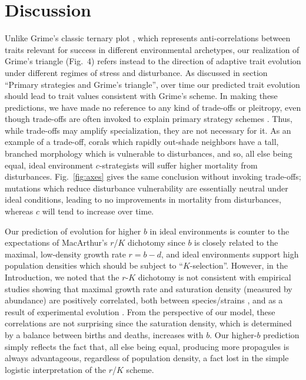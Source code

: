 \documentclass[11pt]{article}
\begin{document}
\section*{Discussion}

Unlike Grime's classic ternary plot \citep{grime_1974}, which represents anti-correlations between traits relevant for success in different environmental archetypes, our realization of Grime's triangle (Fig.~4) refers instead to the direction of adaptive trait evolution under different regimes of stress and disturbance. As discussed in section ``Primary strategies and Grime's triangle'', over time our predicted trait evolution should lead to trait values consistent with Grime's scheme. In making these predictions, we have made no reference to any kind of trade-offs or pleitropy, even though trade-offs are often invoked to explain primary strategy schemes \citep{macarthur_1962,winemiller_1992,aerts_1999}. Thus, while trade-offs may amplify specialization, they are not necessary for it. As an example of a trade-off, corals which rapidly out-shade neighbors have a tall, branched morphology which is vulnerable to disturbances, and so, all else being equal, ideal environment $c$-strategists will suffer higher mortality from disturbances. Fig.~\ref{fig:axes} gives the same conclusion without invoking trade-offs; mutations which reduce disturbance vulnerability are essentially neutral under ideal conditions, leading to no improvements in mortality from disturbances, whereas $c$ will tend to increase over time. 

Our prediction of evolution for higher $b$ in ideal environments is counter to the expectations of MacArthur's $r$/$K$ dichotomy \citep{macarthur_1962} since $b$ is closely related to the maximal, low-density growth rate $r=b-d$, and ideal environments support high population densities which should be subject to ``$K$-selection''. However, in the Introduction, we noted that the $r$-$K$ dichotomy is not consistent with empirical studies showing that maximal growth rate and saturation density (measured by abundance) are positively correlated, both between species/strains \citep{luckinbill_1979,kuno_1991,hendriks_2005,fitzsimmons_2010}, and as a result of experimental evolution \citep{luckinbill_1978,luckinbill_1979}. From the perspective of our model, these correlations are not surprising since the saturation density, which is determined by a balance between births and deaths, increases with $b$. Our higher-$b$ prediction simply reflects the fact that, all else being equal, producing more propagules is always advantageous, regardless of population density, a fact lost in the simple logistic interpretation of the $r$/$K$ scheme. 
\end{document}
